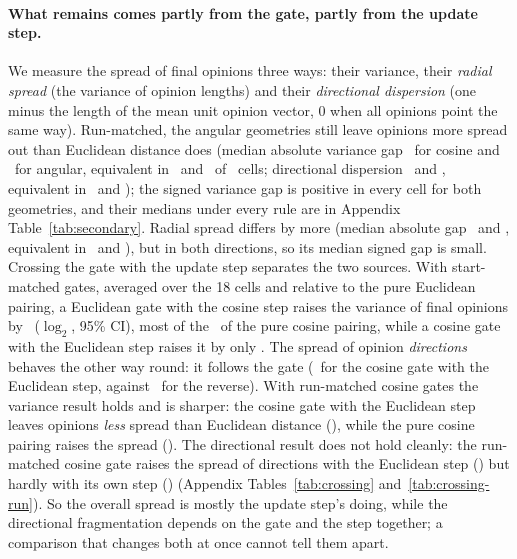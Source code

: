\documentclass[11pt]{article}
\begin{document}
\paragraph{What remains comes partly from the gate, partly from the update step.}
We measure the spread of final opinions three ways: their variance, their \emph{radial spread} (the variance of opinion lengths) and their \emph{directional dispersion} (one minus the length of the mean unit opinion vector, 0 when all opinions point the same way).
Run-matched, the angular geometries still leave opinions more spread out than Euclidean distance does (median absolute variance gap \VRunVarGapCos\ for cosine and \VRunVarGapAng\ for angular, equivalent in \VRunVarEquivCos\ and \VRunVarEquivAng\ of \VCellsPerGeom\ cells; directional dispersion \VRunDispGapCos\ and \VRunDispGapAng, equivalent in \VRunDispEquivCos\ and \VRunDispEquivAng); the signed variance gap is positive in every cell for both geometries, and their medians under every rule are in Appendix Table~\ref{tab:secondary}.
Radial spread differs by more (median absolute gap \VRunRadialGapCos\ and \VRunRadialGapAng, equivalent in \VRunRadialEquivCos\ and \VRunRadialEquivAng), but in both directions, so its median signed gap is small.
Crossing the gate with the update step separates the two sources.
With start-matched gates, averaged over the 18 cells and relative to the pure Euclidean pairing, a Euclidean gate with the cosine step raises the variance of final opinions by \VXEucCosVar\ ($\log_2$, 95\% CI), most of the \VXCosCosVar\ of the pure cosine pairing, while a cosine gate with the Euclidean step raises it by only \VXCosEucVar.
The spread of opinion \emph{directions} behaves the other way round: it follows the gate (\VXCosEucDisp\ for the cosine gate with the Euclidean step, against \VXEucCosDisp\ for the reverse).
With run-matched cosine gates the variance result holds and is sharper: the cosine gate with the Euclidean step leaves opinions \emph{less} spread than Euclidean distance (\VXRCosEucVar), while the pure cosine pairing raises the spread (\VXRCosCosVar).
The directional result does not hold cleanly: the run-matched cosine gate raises the spread of directions with the Euclidean step (\VXRCosEucDisp) but hardly with its own step (\VXRCosCosDisp) (Appendix Tables~\ref{tab:crossing} and~\ref{tab:crossing-run}).
So the overall spread is mostly the update step's doing, while the directional fragmentation depends on the gate and the step together; a comparison that changes both at once cannot tell them apart.
\end{document}
